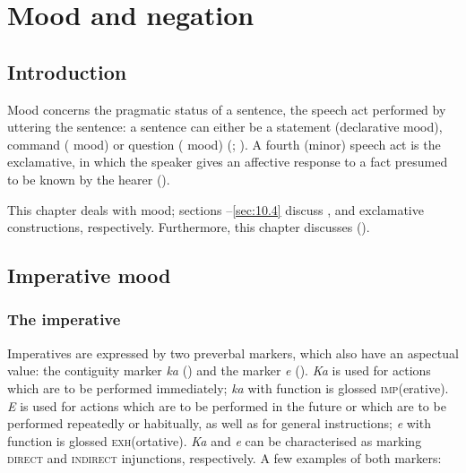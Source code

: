 \chapter[Mood and \isi{negation}]{Mood and negation}\label{ch:10}
\section{Introduction}\label{sec:10.1}

Mood concerns the pragmatic status of a sentence, the speech act performed by uttering the sentence: a sentence can either be a statement (declarative mood), command ( mood) or question ( mood) (\citealt[95]{Dixon2010-1}; \citealt[294]{Payne1997}). A fourth (minor) speech act is the exclamative, in which the speaker gives an affective response to a fact presumed to be known by the hearer (\citealt[316]{KönigSiemund2007}).

This chapter deals with mood; sections –\ref{sec:10.4} discuss ,  and exclamative constructions, respectively. Furthermore, this chapter discusses  ().

\section{Imperative mood}\label{sec:10.2}
\subsection{The imperative} \label{sec:10.2.1}
Imperatives are expressed by two preverbal markers, which also have an aspectual value: the contiguity marker \textit{ka} () and the  marker \textit{e} (). \textit{Ka} is used for actions which are to be performed immediately; \textit{ka} with  function is glossed \textsc{imp}(erative). \textit{E} is used for actions which are to be performed in the future or which are to be performed repeatedly or habitually, as well as for general instructions; \textit{e} with  function is glossed \textsc{exh}(ortative). \textit{Ka} and \textit{e} can be characterised as marking \textsc{direct} and \textsc{indirect} injunctions, respectively. A few examples of both markers:

